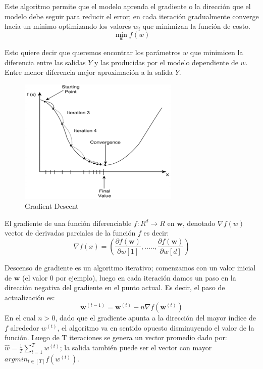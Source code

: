 Este algoritmo permite que el modelo aprenda el gradiente o la dirección que el modelo debe seguir para reducir el error; en cada iteración gradualmente converge hacia un mínimo optimizando los valores $w_i $ que minimizan la función de costo. $$\min_{w} f(w)$$

Esto quiere decir que queremos encontrar los parámetros $w$ que minimicen la diferencia entre las salidas $Y$ y las producidas por el modelo dependiente de $w$. Entre menor  diferencia mejor aproximación a la salida $Y$. 

\begin{figure}[H] \centering
  \includegraphics[height=6cm,keepaspectratio=true,clip=true]{imagenes/MarcoTeorico/gradient-descent.png}
  \caption{Gradient Descent }\label{Fig:gradient-descent}
\end{figure}


El gradiente de una función diferenciable $ f: R^d \longrightarrow R $ en $\textbf{w}$, denotado $ \nabla f(w) $ vector de derivadas parciales de la función $f$ es decir:
\begin{equation}
\nabla f(x) = (\frac{\partial f(\textbf{w})}{\partial w[1]},....., \frac{\partial f(\textbf{w})}{\partial w[d]})
\end{equation}

Descenso de gradiente es un algoritmo iterativo; comenzamos con un valor inicial de $\textbf{w}$ (el valor 0 por ejemplo), luego en cada iteración damos un paso en la dirección negativa del gradiente en el punto actual. Es decir, el paso de actualización es:
\begin{equation}
\textbf{w}^{(t-1)} = \textbf{w}^{(t)} - n \nabla f(\textbf{w}^{(t)})
\end{equation}
En el cual $n > 0$, dado que el gradiente apunta a la dirección del mayor índice de $f$ alrededor $w^{(t)}$, el algoritmo va en sentido opuesto disminuyendo el valor de la función. Luego de T iteraciones se genera un vector promedio dado por: $ \hat{w} = \frac{1}{T} \sum_{t=1}^T w^{(t)}$; la salida también puede ser el vector con mayor  $ argmin_{t \in [T]} f(w^{(t)}) $.


